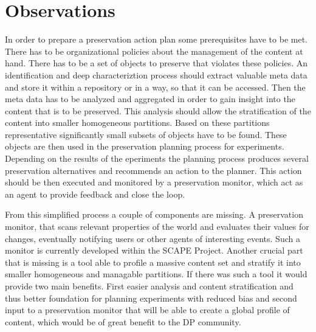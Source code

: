 \section{Observations}
In order to prepare a preservation action plan some prerequisites have to be met. There has to be organizational policies about the management of the content at hand. There has to be a set of objects to preserve that violates these policies. An identification and deep characteriztion process should extract valuable meta data and store it within a repository or in a way, so that it can be accessed. Then the meta data has to be analyzed and aggregated in order to gain insight into the content that is to be preserved. This analysis should allow the stratification of the content into smaller homogeneous partitions. Based on these partitions representative significantly small subsets of objects have to be found. These objects are then used in the preservation planning process for experiments. Depending on the results of the eperiments the planning process produces several preservation alternatives and recommends an action to the planner. This action should be then executed and monitored by a preservation monitor, which act as an agent to provide feedback and close the loop.

From this simplified process a couple of components are missing. A preservation monitor, that scans relevant properties of the world and evaluates their values for changes, eventually notifying users or other agents of interesting events. Such a monitor is currently developed within the SCAPE Project. %
Another crucial part that is missing is a tool able to profile a massive content set and stratify it into smaller homogeneous and managable partitions. If there was such a tool it would provide two main benefits. First easier analysis and content stratification and thus better foundation for planning experiments with reduced bias and second input to a preservation monitor that will be able to create a global profile of content, which would be of great benefit to the DP community.

